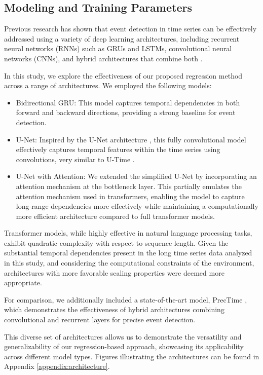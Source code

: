 \documentclass{article}
\begin{document}
\subsection{Modeling and Training Parameters}

Previous research has shown that event detection in time series can be effectively addressed using a variety of deep learning architectures, including recurrent neural networks (RNNs) such as GRUs and LSTMs, convolutional neural networks (CNNs), and hybrid architectures that combine both \citep{supratak2017,perslev2019,phan2019}.

In this study, we explore the effectiveness of our proposed regression method across a range of architectures. We employed the following models:

\begin{itemize}
\item Bidirectional GRU: This model captures temporal dependencies in both forward and backward directions, providing a strong baseline for event detection.
\item U-Net: Inspired by the U-Net architecture \citep{ronneberger2015}, this fully convolutional model effectively captures temporal features within the time series using convolutions, very similar to U-Time \citep{perslev2019}.
\item U-Net with Attention: We extended the simplified U-Net by incorporating an attention mechanism at the bottleneck layer. This partially emulates the attention mechanism used in transformers, enabling the model to capture long-range dependencies more effectively while maintaining a computationally more efficient architecture compared to full transformer models.
\end{itemize}

Transformer models, while highly effective in natural language processing tasks, exhibit quadratic complexity with respect to sequence length. Given the substantial temporal dependencies present in the long time series data analyzed in this study, and considering the computational constraints of the environment, architectures with more favorable scaling properties were deemed more appropriate.

For comparison, we additionally included a state-of-the-art model, PrecTime \citep{gaugel2023}, which demonstrates the effectiveness of hybrid architectures combining convolutional and recurrent layers for precise event detection.

This diverse set of architectures allows us to demonstrate the versatility and generalizability of our regression-based approach, showcasing its applicability across different model types. Figures illustrating the architectures can be found in Appendix \ref{appendix:architecture}.
\end{document}
